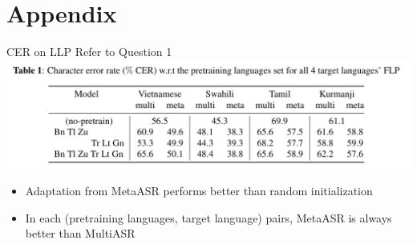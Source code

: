 \documentclass{beamer}
\begin{document}
\section{Appendix}
\begin{frame}[t]{CER on LLP}
  Refer to Question 1
  \center \includegraphics[width=1.0\textwidth]{fig/flp_table.png}

  \begin{itemize}
    \item Adaptation from MetaASR performs better than random initialization
    \item In each (pretraining languages, target language) pairs, MetaASR is always better than MultiASR
  \end{itemize}
\end{frame}



\end{document}
